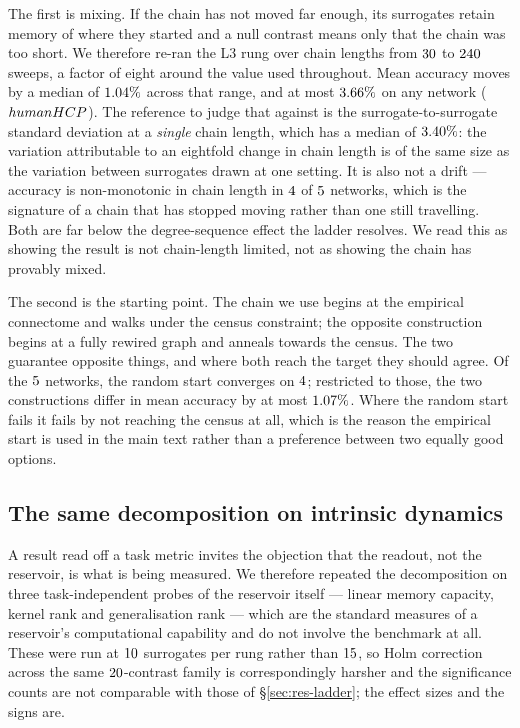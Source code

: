 The first is mixing. If the chain has not moved far enough, its surrogates retain memory
of where they started and a null contrast means only that the chain was too short. We
therefore re-ran the L3 rung over chain lengths from $30$ to $240$
sweeps, a factor of eight around the value used throughout. Mean accuracy moves by a
median of $1.04\%$ across that range, and at most $3.66\%$ on any
network ($human HCP$). The reference to judge that against is the
surrogate-to-surrogate standard deviation at a \emph{single} chain length, which has a
median of $3.40\%$: the variation attributable to an eightfold change in chain
length is of the same size as the variation between surrogates drawn at one setting. It
is also not a drift --- accuracy is non-monotonic in chain length in
$4$ of $5$ networks, which is the signature of a chain
that has stopped moving rather than one still travelling. Both are far below the degree-sequence effect the
ladder resolves. We read this as showing the result is not chain-length limited, not as
showing the chain has provably mixed.

The second is the starting point. The chain we use begins at the empirical connectome
and walks under the census constraint; the opposite construction begins at a fully
rewired graph and anneals towards the census. The two guarantee opposite things, and
where both reach the target they should agree. Of the $5$ networks, the
random start converges on $4$; restricted to those, the two
constructions differ in mean accuracy by at most $1.07\%$. Where the random start
fails it fails by not reaching the census at all, which is the reason the empirical start
is used in the main text rather than a preference between two equally good options.

\subsection{The same decomposition on intrinsic dynamics}
\label{sec:res-dynamics}

A result read off a task metric invites the objection that the readout, not the
reservoir, is what is being measured. We therefore repeated the decomposition on three
task-independent probes of the reservoir itself --- linear memory capacity, kernel rank
and generalisation rank --- which are the standard measures of a reservoir's
computational capability and do not involve the benchmark at all. These were run at
$10$ surrogates per rung rather than $15$, so Holm correction
across the same $20$-contrast family is correspondingly harsher and the
significance counts are not comparable with those of \S\ref{sec:res-ladder}; the effect
sizes and the signs are.

